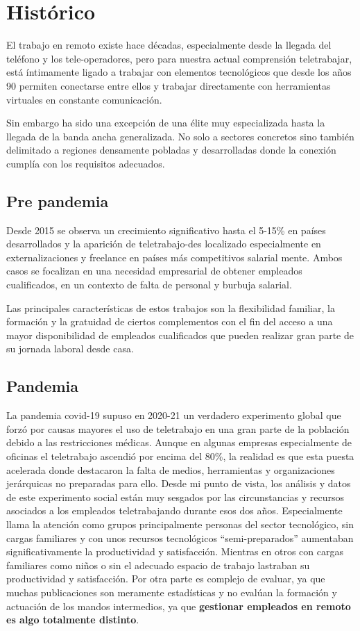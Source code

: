 \section{Histórico}
El trabajo en remoto existe hace décadas, especialmente desde la llegada del teléfono y los tele-operadores, pero para nuestra actual comprensión teletrabajar, está íntimamente ligado a trabajar con elementos tecnológicos que desde los años 90 permiten conectarse entre ellos y trabajar directamente con herramientas virtuales en constante comunicación.

Sin embargo ha sido una excepción de una élite muy especializada hasta la llegada de la banda ancha generalizada. No solo a sectores concretos sino también delimitado a regiones densamente pobladas y desarrolladas donde la conexión cumplía con los requisitos adecuados. 

\subsection{Pre pandemia}
Desde 2015 se observa un crecimiento significativo hasta el 5-15\%\cite{c_oecd_productividad_telework} en países desarrollados y la aparición de teletrabajo-des localizado especialmente en externalizaciones y freelance en países más competitivos salarial mente. Ambos casos se focalizan en una necesidad empresarial de obtener empleados cualificados, en un contexto de falta de personal y burbuja salarial.

Las principales características de estos trabajos son la flexibilidad familiar, la formación y la gratuidad de ciertos complementos con el fin del acceso a una mayor  disponibilidad de empleados cualificados que pueden realizar gran parte de su jornada laboral desde casa.

\subsection{Pandemia}
La pandemia covid-19 supuso en 2020-21 un verdadero experimento global que forzó por causas mayores\cite{c_boe_pandemia} el uso de teletrabajo en una gran parte de la población debido a las restricciones médicas. Aunque en algunas empresas especialmente de oficinas el teletrabajo ascendió por encima del 80\%, la realidad es que esta puesta acelerada donde destacaron la falta de medios, herramientas y organizaciones jerárquicas no preparadas para ello.
Desde mi punto de vista, los análisis y datos de este experimento social están muy sesgados por las circunstancias y recursos asociados a los empleados teletrabajando durante esos dos años. Especialmente llama la atención como grupos principalmente personas del sector tecnológico, sin cargas familiares y con unos recursos tecnológicos “semi-preparados” aumentaban significativamente la productividad y satisfacción. Mientras en otros con cargas familiares como niños o sin el adecuado espacio de trabajo lastraban su productividad y satisfacción. Por otra parte es complejo de evaluar, ya que muchas publicaciones son meramente estadísticas y no evalúan la formación y actuación de los mandos intermedios, ya que \textbf{gestionar empleados en remoto  es algo totalmente distinto}.

